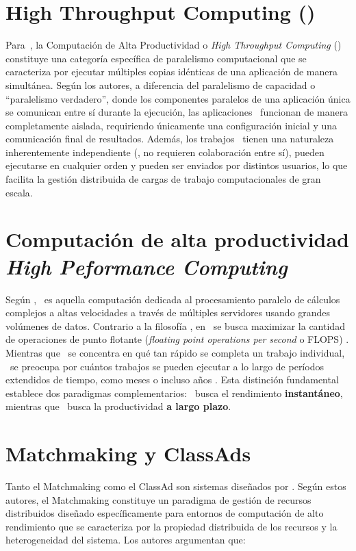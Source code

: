 \section{High Throughput Computing (\HTC)}
\noindent
Para~\cite{Morgan2009}, la Computación de Alta Productividad o \textit{High Throughput Computing} (\HTC) constituye una categoría específica de paralelismo computacional que se caracteriza por ejecutar múltiples copias idénticas de una aplicación de manera simultánea. Según los autores, a diferencia del paralelismo de capacidad o ``paralelismo verdadero'', donde los componentes paralelos de una aplicación única se comunican entre sí durante la ejecución, las aplicaciones \HTC~funcionan de manera completamente aislada, requiriendo únicamente una configuración inicial y una comunicación final de resultados. Además, los trabajos \HTC~tienen una naturaleza inherentemente independiente (\ie, no requieren colaboración entre sí), pueden ejecutarse en cualquier orden y pueden ser enviados por distintos usuarios, lo que facilita la gestión distribuida de cargas de trabajo computacionales de gran escala.

\section{Computación de alta productividad \textit{High Peformance Computing} \HPC}

\noindent
Según \cite{SK2023}, \HPC~es aquella computación dedicada al procesamiento paralelo de cálculos complejos a altas velocidades a través de múltiples servidores usando grandes volúmenes de datos. Contrario a la filosofía \HTC, en \HPC~se busca maximizar la cantidad de operaciones de punto flotante (\textit{floating point operations per second} o FLOPS) \citep{HTCondor-what-is-htc}. Mientras que \HPC~se concentra en qué tan rápido se completa un trabajo individual, \HTC~se preocupa por cuántos trabajos se pueden ejecutar a lo largo de períodos extendidos de tiempo, como meses o incluso años \citep{Raman1998}. Esta distinción fundamental establece dos paradigmas complementarios: \HPC~busca el rendimiento \textbf{instantáneo}, mientras que \HTC~busca la productividad \textbf{a largo plazo}.

\section{Matchmaking y ClassAds}
Tanto el Matchmaking como el ClassAd son sistemas diseñados por \cite{Raman1998}. Según estos autores, el Matchmaking constituye un paradigma de gestión de recursos distribuidos diseñado específicamente para entornos de computación de alto rendimiento que se caracteriza por la propiedad distribuida de los recursos y la heterogeneidad del sistema. Los autores argumentan que:

